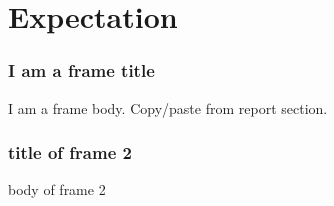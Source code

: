
\section{Expectation}

\frame{\sectionpage}


\begin{frame} %
\frametitle{I am a frame title}
I am a frame body.
Copy/paste from report section.
\end{frame}

\begin{frame}
\frametitle{title of frame 2}
body of frame 2
\end{frame}

